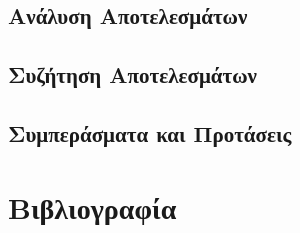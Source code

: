 \documentclass[11pt]{report}
\begin{document}
\chapter{Ανάλυση Αποτελεσμάτων}
\label{sec:org0242a7b}
\label{sec:result_analysis}

\chapter{Συζήτηση Αποτελεσμάτων}
\label{sec:org67572d0}
\label{sec:result_discussion}

\chapter{Συμπεράσματα και Προτάσεις}
\label{sec:org19f6959}
\label{sec:conclusion}

\part*{Βιβλιογραφία}
\label{sec:orga0ef49a}
\end{document}
